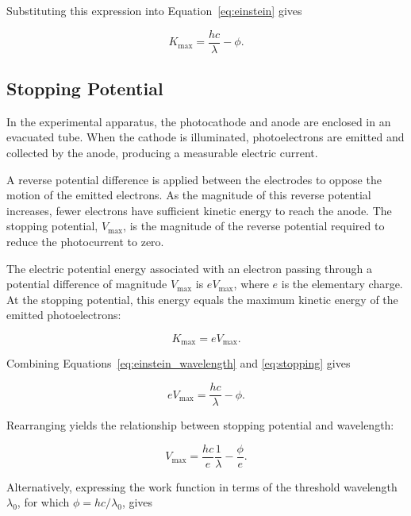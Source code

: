 \documentclass[12pt,a4paper]{article}
\begin{document}
Substituting this expression into Equation~\ref{eq:einstein} gives

\begin{equation}
    K_{\max} = \frac{hc}{\lambda} - \phi.
    \label{eq:einstein_wavelength}
\end{equation}

\subsection{Stopping Potential}

In the experimental apparatus, the photocathode and anode are enclosed in an evacuated tube. When the cathode is illuminated, photoelectrons are emitted and collected by the anode, producing a measurable electric current.

A reverse potential difference is applied between the electrodes to oppose the motion of the emitted electrons. As the magnitude of this reverse potential increases, fewer electrons have sufficient kinetic energy to reach the anode. The stopping potential, \(V_{\max}\), is the magnitude of the reverse potential required to reduce the photocurrent to zero.

The electric potential energy associated with an electron passing through a potential difference of magnitude \(V_{\max}\) is \(eV_{\max}\), where \(e\) is the elementary charge. At the stopping potential, this energy equals the maximum kinetic energy of the emitted photoelectrons:

\begin{equation}
    K_{\max} = eV_{\max}.
    \label{eq:stopping}
\end{equation}

Combining Equations~\ref{eq:einstein_wavelength} and \ref{eq:stopping} gives

\begin{equation}
    eV_{\max} = \frac{hc}{\lambda} - \phi.
\end{equation}

Rearranging yields the relationship between stopping potential and wavelength:

\begin{equation}
    V_{\max} = \frac{hc}{e}\frac{1}{\lambda}
    - \frac{\phi}{e}.
    \label{eq:stopping_wavelength}
\end{equation}

Alternatively, expressing the work function in terms of the threshold wavelength \(\lambda_0\), for which \(\phi=hc/\lambda_0\), gives
\end{document}
